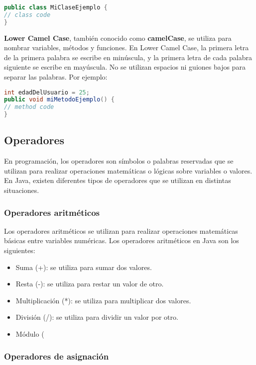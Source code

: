 \documentclass{article}
\begin{document}
\begin{lstlisting}[language=Java]
public class MiClaseEjemplo {
// class code
}
\end{lstlisting}

\textbf{Lower Camel Case}, también conocido como \textbf{camelCase}, se utiliza para nombrar variables, métodos y funciones. En Lower Camel Case, la primera letra de la primera palabra se escribe en minúscula, y la primera letra de cada palabra siguiente se escribe en mayúscula. No se utilizan espacios ni guiones bajos para separar las palabras. Por ejemplo:

\begin{lstlisting}[language=Java]
int edadDelUsuario = 25;
public void miMetodoEjemplo() {
// method code
}
\end{lstlisting}

\subsection{Operadores}
En programación, los operadores son símbolos o palabras reservadas que se utilizan para realizar operaciones matemáticas o lógicas sobre variables o valores. En Java, existen diferentes tipos de operadores que se utilizan en distintas situaciones.

\subsubsection*{Operadores aritméticos}

Los operadores aritméticos se utilizan para realizar operaciones matemáticas básicas entre variables numéricas. Los operadores aritméticos en Java son los siguientes:

\begin{itemize}
\item Suma (+): se utiliza para sumar dos valores.
\item Resta (-): se utiliza para restar un valor de otro.
\item Multiplicación (*): se utiliza para multiplicar dos valores.
\item División (/): se utiliza para dividir un valor por otro.
\item Módulo (%
\end{itemize}

\subsubsection*{Operadores de asignación}
\end{document}
